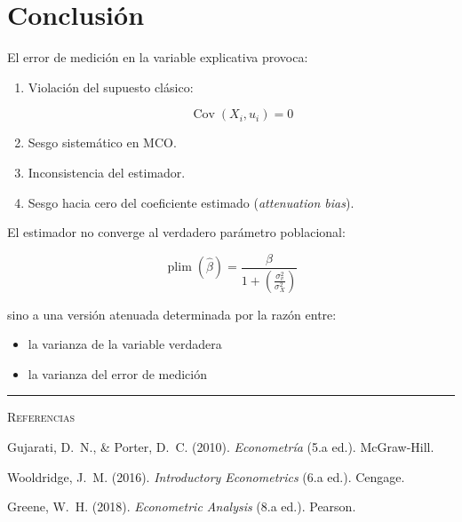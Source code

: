 \documentclass[12pt,letterpaper]{article}
\newcommand{\Cov}{\operatorname{Cov}}
\newcommand{\plim}{\operatorname{plim}}
\begin{document}
\section{Conclusión}

\begin{clave}

El error de medición en la variable explicativa provoca:

\begin{enumerate}[leftmargin=1.8em]

\item Violación del supuesto clásico:

\begin{equation*}
\Cov(X_i,u_i)=0
\end{equation*}

\item Sesgo sistemático en MCO.

\item Inconsistencia del estimador.

\item Sesgo hacia cero del coeficiente estimado
(\textit{attenuation bias}).

\end{enumerate}

El estimador no converge al verdadero parámetro poblacional:

\begin{equation*}
\plim(\hat{\beta})
=
\frac{\beta}
{1+\left(\frac{\sigma_v^2}{\sigma_X^2}\right)}
\end{equation*}

sino a una versión atenuada determinada por la razón entre:

\begin{itemize}
\item la varianza de la variable verdadera
\item la varianza del error de medición
\end{itemize}

\end{clave}

\vspace{12pt}

\noindent\rule{\linewidth}{0.4pt}

\vspace{10pt}

\begin{center}
\small\textsc{Referencias}
\end{center}

\vspace{6pt}

\noindent
Gujarati, D.~N., \& Porter, D.~C. (2010).
\textit{Econometría} (5.a ed.).
McGraw-Hill.

\vspace{6pt}

\noindent
Wooldridge, J.~M. (2016).
\textit{Introductory Econometrics} (6.a ed.).
Cengage.

\vspace{6pt}

\noindent
Greene, W.~H. (2018).
\textit{Econometric Analysis} (8.a ed.).
Pearson.

\end{document}
